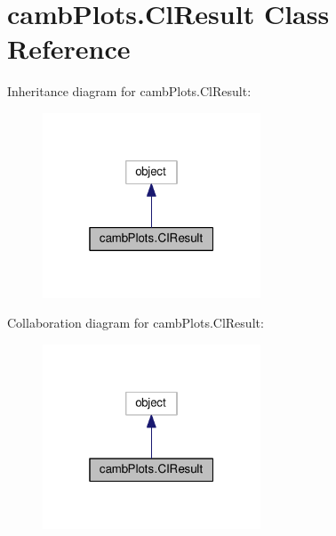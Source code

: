 \hypertarget{classcambPlots_1_1ClResult}{}\section{camb\+Plots.\+Cl\+Result Class Reference}
\label{classcambPlots_1_1ClResult}


Inheritance diagram for camb\+Plots.\+Cl\+Result\+:
\nopagebreak
\begin{figure}[H]
\begin{center}
\leavevmode
\includegraphics[width=184pt]{classcambPlots_1_1ClResult__inherit__graph}
\end{center}
\end{figure}


Collaboration diagram for camb\+Plots.\+Cl\+Result\+:
\nopagebreak
\begin{figure}[H]
\begin{center}
\leavevmode
\includegraphics[width=184pt]{classcambPlots_1_1ClResult__coll__graph}
\end{center}
\end{figure}
